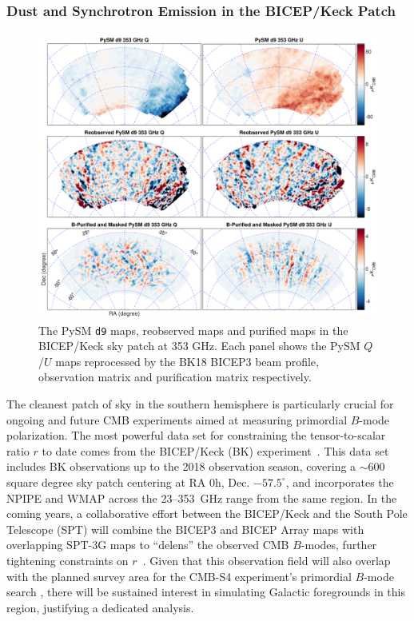 \documentclass[twocolumn]{aastex631}
\begin{document}
\subsubsection{Dust and Synchrotron Emission in the BICEP/Keck Patch}
\label{sec:BK_validation}
\begin{figure}
    \centering
    \includegraphics[width=2.\columnwidth]{figures/pysm_d9_353_delta_reobs_B_pub.pdf}
    \caption{The PySM \texttt{d9} maps, reobserved maps and purified maps in the BICEP/Keck sky patch at 353 GHz. Each panel shows the
    PySM $Q$/$U$ maps reprocessed by the BK18 BICEP3 beam profile, observation matrix and purification matrix respectively.}
    \label{fig:psym_BKmatrix}
\end{figure}

The cleanest patch of sky in the southern hemisphere is particularly crucial for ongoing and future CMB experiments aimed at measuring primordial $B$-mode polarization. The most powerful data set for constraining the tensor-to-scalar ratio $r$ to date comes from the BICEP/Keck (BK) experiment~\citep[``BK18'';][]{Ade:2021}. This data set includes BK observations up to the 2018 observation season, covering a $\sim 600$ square degree sky patch centering at RA 0h, Dec. $-57.5^{\circ}$, and incorporates the NPIPE and WMAP across the 23--353~GHz range from the same region. In the coming years, a collaborative effort between the BICEP/Keck and the South Pole Telescope (SPT) will combine the BICEP3 and BICEP Array maps with overlapping SPT-3G maps to ``delens'' the observed CMB $B$-modes, further tightening constraints on $r$~\citep{TheBICEP/KeckCollaboration:2024}. Given that this observation field will also overlap with the planned survey area for the CMB-S4 experiment's primordial $B$-mode search \citep{Abazajian:2022}, there will be sustained interest in simulating Galactic foregrounds in this region, justifying a dedicated analysis. 
\end{document}
